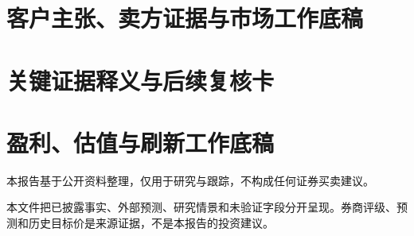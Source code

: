 \documentclass[a4paper,11pt,openany,fontset=none]{ctexrep}
\newcommand{\reportdisclaimer}{本报告基于公开资料整理，仅用于研究与跟踪，不构成任何证券买卖建议。}
\begin{document}
\chapter{客户主张、卖方证据与市场工作底稿}

\chapter{关键证据释义与后续复核卡}

\chapter{盈利、估值与刷新工作底稿}

\clearpage
\thispagestyle{empty}
\vspace*{4cm}
\begin{disclosurebox}[免责声明]
\small
\reportdisclaimer\par
本文件把已披露事实、外部预测、研究情景和未验证字段分开呈现。券商评级、预测和历史目标价是来源证据，不是本报告的投资建议。
\end{disclosurebox}
\end{document}
